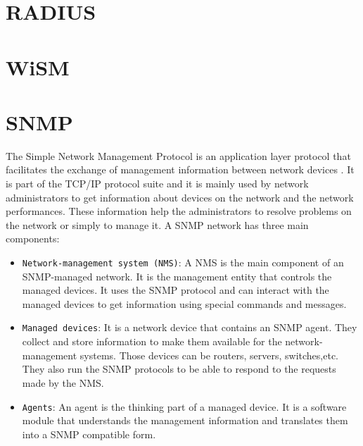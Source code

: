 \section{RADIUS}


\section{WiSM}


\section{SNMP}

The Simple Network Management Protocol is an application layer protocol that facilitates the exchange of management information between network devices \cite{snmp}. It is part of the TCP/IP protocol suite and it is mainly used by network administrators to get information about devices on the network and the network performances. These information help the administrators to resolve problems on the network or simply to manage it.
A SNMP network has three main components:

\begin{itemize}
	\item \texttt{Network-management system (NMS)}: A NMS is the main component of an SNMP-managed network. It is the management entity that controls the managed devices. It uses the SNMP protocol and can interact with the managed devices to get information using special commands and messages.
	
	\item \texttt{Managed devices}: It is a network device that contains an SNMP agent. They collect and store information to make them available for the network-management systems. Those devices can be routers, servers, switches,etc. They also run the SNMP protocols to be able to respond to the requests made by the NMS.
	
	\item \texttt{Agents}: An agent is the thinking part of a managed device. It is a software module that understands the management information and translates them into a SNMP compatible form.
\end{itemize}

